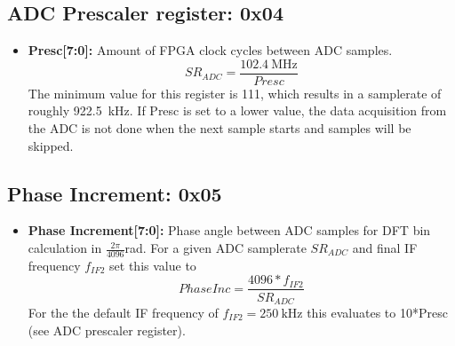 \documentclass{article}
\newcommand{\bitrect}[2]{
  \begin{pgfonlayer}{foreground}
    \draw [thick] (0,0) rectangle (#1,1);
    \pgfmathsetmacro\result{#1-1}
    \foreach \x in {1,...,\result}
      \draw [thick] (\x,1) -- (\x, 0.8);
  \end{pgfonlayer}
  \bitlabels{#1}{#2}
}
\newcommand{\rwbits}[3]{
  \draw [thick] (#1,0) rectangle ++(#2,1) node[pos=0.5]{#3};
  \pgfmathsetmacro\start{#1+0.5}
  \pgfmathsetmacro\finish{#1+#2-0.5}
}
\newcommand{\robits}[3]{
  \begin{pgfonlayer}{background}
    \draw [thick, fill=lightgray] (#1,0) rectangle ++(#2,1) node[pos=0.5]{#3};
  \end{pgfonlayer}
  \pgfmathsetmacro\start{#1+0.5}
  \pgfmathsetmacro\finish{#1+#2-0.5}
}
\newcommand{\bitlabels}[2]{
  \foreach \bit in {1,...,#1}{
     \pgfmathsetmacro\result{#2}
     \node [above] at (\bit-0.5, 1) {\pgfmathprintnumber{\result}};
   }
}
\begin{document}
\subsection{ADC Prescaler register: 0x04}
\label{reg:ADC}
\begin{center}
\end{center}
\begin{itemize}
\item \textbf{Presc[7:0]:} Amount of FPGA clock cycles between ADC samples.
$$ SR_{ADC} = \frac{\SI{102.4}{\mega\hertz}}{Presc} $$
The minimum value for this register is 111, which results in a samplerate of roughly \SI{922.5}{\kilo\hertz}. If Presc is set to a lower value, the data acquisition from the ADC is not done when the next sample starts and samples will be skipped.
\end{itemize}

\subsection{Phase Increment: 0x05}
\label{reg:phaseinc}
\begin{center}
\end{center}
\begin{itemize}
\item \textbf{Phase Increment[7:0]:} Phase angle between ADC samples for DFT bin calculation in $\frac{2\pi}{4096}$rad.
For a given ADC samplerate $SR_{ADC}$ and final IF frequency $f_{IF2}$ set this value to
$$ PhaseInc = \frac{4096 * f_{IF2}}{SR_{ADC}} $$
For the the default IF frequency of $f_{IF2} = \SI{250}{\kilo\hertz}$ this evaluates to 10*Presc (see ADC prescaler register).
\end{itemize}
\end{document}

